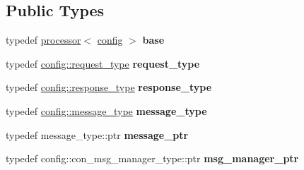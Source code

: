 \subsection*{Public Types}
\begin{DoxyCompactItemize}
\item 
typedef \hyperlink{classwebsocketpp_1_1processor_1_1processor}{processor}$<$ \hyperlink{classconfig}{config} $>$ {\bfseries base}\hypertarget{classwebsocketpp_1_1processor_1_1hybi00_ae8842975f6937e834d7df16ecf5b756f}{}\label{classwebsocketpp_1_1processor_1_1hybi00_ae8842975f6937e834d7df16ecf5b756f}

\item 
typedef \hyperlink{classwebsocketpp_1_1http_1_1parser_1_1request}{config\+::request\+\_\+type} {\bfseries request\+\_\+type}\hypertarget{classwebsocketpp_1_1processor_1_1hybi00_a9992ac4efa9cc4d46ee0e9e1060cf860}{}\label{classwebsocketpp_1_1processor_1_1hybi00_a9992ac4efa9cc4d46ee0e9e1060cf860}

\item 
typedef \hyperlink{classwebsocketpp_1_1http_1_1parser_1_1response}{config\+::response\+\_\+type} {\bfseries response\+\_\+type}\hypertarget{classwebsocketpp_1_1processor_1_1hybi00_abef7fc8290a6d30e086c639d5e0b393d}{}\label{classwebsocketpp_1_1processor_1_1hybi00_abef7fc8290a6d30e086c639d5e0b393d}

\item 
typedef \hyperlink{classwebsocketpp_1_1message__buffer_1_1message}{config\+::message\+\_\+type} {\bfseries message\+\_\+type}\hypertarget{classwebsocketpp_1_1processor_1_1hybi00_a68b8a926b9fc5fcd296cb698920280ab}{}\label{classwebsocketpp_1_1processor_1_1hybi00_a68b8a926b9fc5fcd296cb698920280ab}

\item 
typedef message\+\_\+type\+::ptr {\bfseries message\+\_\+ptr}\hypertarget{classwebsocketpp_1_1processor_1_1hybi00_a300a0810d09570108e3dd747d97a8257}{}\label{classwebsocketpp_1_1processor_1_1hybi00_a300a0810d09570108e3dd747d97a8257}

\item 
typedef config\+::con\+\_\+msg\+\_\+manager\+\_\+type\+::ptr {\bfseries msg\+\_\+manager\+\_\+ptr}\hypertarget{classwebsocketpp_1_1processor_1_1hybi00_aa33fb6bfdb3c905f267ba7d0c48b192e}{}\label{classwebsocketpp_1_1processor_1_1hybi00_aa33fb6bfdb3c905f267ba7d0c48b192e}

\end{DoxyCompactItemize}
